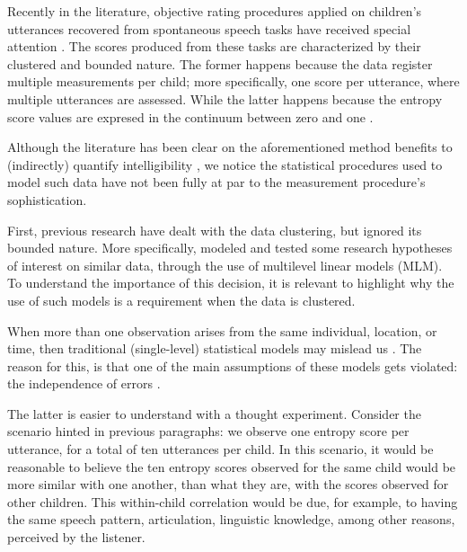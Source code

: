Recently in the literature, objective rating procedures applied on children's utterances recovered from spontaneous speech tasks have received special attention \citep{Boonen_et_al_2021, Hustad_et_al_2020}. The scores produced from these tasks are characterized by their clustered and bounded nature. The former happens because the data register multiple measurements per child; more specifically, one score per utterance, where multiple utterances are assessed. While the latter happens because the entropy score values are expresed in the continuum between zero and one \citep{Shannon_1948}.

\begin{comment}	
	
	Moreover, the previous advantages are further emphasized by the use of stimuli gathered from spontaneous speech tasks, as they have a greater level of ecological validity, especially compared to contextualized utterances or reading at loud tasks \citep{Flipsen_2006, Ertmer_2011}.
	
\end{comment}

Although the literature has been clear on the aforementioned method benefits to (indirectly) quantify intelligibility \citep{Boonen_et_al_2020, Boonen_et_al_2021, Hustad_et_al_2020}, we notice the statistical procedures used to model such data have not been fully at par to the measurement procedure's sophistication.

First, previous research have dealt with the data clustering, but ignored its bounded nature. More specifically, \cite{Boonen_et_al_2021} modeled and tested some research hypotheses of interest on similar data, through the use of multilevel linear models (MLM). To understand the importance of this decision, it is relevant to highlight why the use of such models is a requirement when the data is clustered. 

When more than one observation arises from the same individual, location, or time, then traditional (single-level) statistical models may mislead us \citep{McElreath_2020}. The reason for this, is that one of the main assumptions of these models gets violated: the independence of errors \citep{Finch_et_al_2019}.

The latter is easier to understand with a thought experiment. Consider the scenario hinted in previous paragraphs: we observe one entropy score per utterance, for a total of ten utterances per child. In this scenario, it would be reasonable to believe the ten entropy scores observed for the same child would be more similar with one another, than what they are, with the scores observed for other children. This within-child correlation would be due, for example, to having the same speech pattern,  articulation, linguistic knowledge, among other reasons, perceived by the listener.

